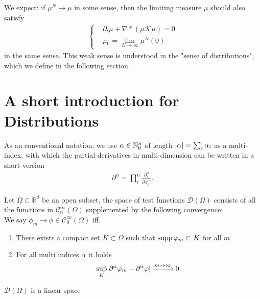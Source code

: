 We expect: if $\mu ^{N} \to \mu  $  in some sense, then the limiting measure $\mu $ should also satisfy 
 \begin{align*}
  \begin{cases}
    &\partial_t \mu  + \nabla * (\mu \mathcal{K} \mu ) = 0 \\
    & \mu_0=\lim_{N\to\infty}\mu^N(0)
  \end{cases}
\end{align*}
in the same sense. This weak sense is understood in the "sense of distributions", which we define in the following section.

\section{A short introduction for Distributions}

As an conventional notation, we use $\alpha \in \mathbb{N}_0^n$ of length $\lvert\alpha \rvert = \sum_{i} \alpha_i$ as a multi-index, with which the partial derivatives in multi-dimension can be written in a short version
	\begin{align*}
	\partial^{\alpha } = \prod^n_i \frac{\partial^\alpha_i}{\partial x_i^{\alpha_i}}
	.\end{align*}

\begin{definition}
 Let $\Omega  \subset  \mathbb{R}^{d} $  be an open subset, the space of test functions $\mathcal{D}(\Omega )$
 consists of all the functions in $\mathcal{C}_0^{\infty}(\Omega ) $ supplemented by the following convergence: \\[1ex]
 We say $\phi_m \to  \phi \in  \mathcal{C}_0^{\infty}(\Omega ) $ iff. 
 \begin{enumerate}
   \item There exists a compact set $K \subset  \Omega $ such that $\operatorname*{supp} \varphi_m \subset  K$ for all $ m$
   \item For all multi indices $\alpha $ it holds 
     \begin{align*}
       \sup_K \lvert\partial ^{\alpha } \varphi_m - \partial ^{\alpha } \varphi   \rvert \xrightarrow{m\to \infty}  0 
     .\end{align*}
 \end{enumerate}
\end{definition}
\begin{remark}
 $\mathcal{D}(\Omega )$  is a linear space
\end{remark}

